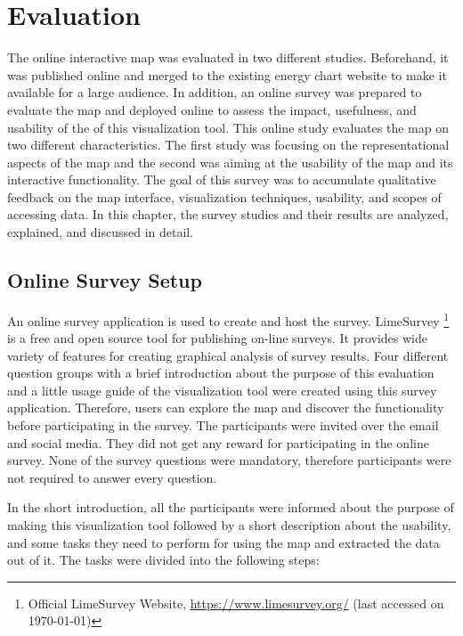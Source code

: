 \chapter{Evaluation}
\label{chap:evaluation}

The online interactive map was evaluated in two different studies. Beforehand, it was published online and merged to the existing energy chart website to make it available for a large audience. In addition, an online survey was prepared to evaluate the map and deployed online to assess the impact, usefulness, and usability of the of this visualization tool.  This online study evaluates the map on two different characteristics. The first study was focusing on the representational aspects of the map and the second was aiming at the usability of the map and its interactive functionality. The goal of this survey was to accumulate qualitative feedback on the map interface, visualization techniques, usability, and scopes of accessing data. In this chapter, the survey studies and their results are analyzed, explained, and discussed in detail.

\section{Online Survey Setup}
\label{chap:suveySetup}

An online survey application is used to create and host the survey. LimeSurvey \footnote{Official LimeSurvey Website, \url{https://www.limesurvey.org/} (last accessed on \today)} is a free and open source tool for publishing on-line surveys. It provides wide variety of features for creating graphical analysis of survey results. Four different question groups with a brief introduction about the purpose of this evaluation and a little usage guide of the visualization tool were created using this survey application. Therefore, users can explore the map and discover the functionality before participating in the survey. The participants were invited over the email and social media. They did not get any reward for participating in the online survey. None of the survey questions were mandatory, therefore participants were not required to answer every question. 

In the short introduction, all the participants were informed about the purpose of making this visualization tool followed by a short description about the usability, and some tasks they need to perform for using the map and extracted the data out of it. The tasks were divided into the following steps:

